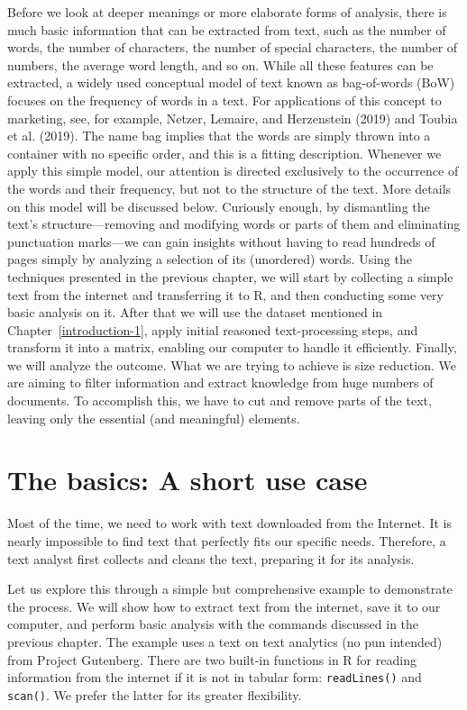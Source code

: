 Before we look at deeper meanings or more elaborate forms of analysis, there
is much basic information that can be extracted from text, such as the
number of words, the number of characters, the number of special
characters, the number of numbers, the average word length, and so on.
While all these features can be extracted, a widely used conceptual
model of text known as bag-of-words (BoW) focuses on the frequency of
words in a text. For applications of this concept to marketing, see,
for example, Netzer, Lemaire, and Herzenstein (2019) and Toubia et al. (2019).
The name bag implies that the words are simply thrown into a container with no
specific order, and this is a fitting description. Whenever we apply
this simple model, our attention is directed exclusively to the
occurrence of the words and their frequency, but not to the structure of
the text. More details on this model will be discussed below. Curiously enough, by dismantling the text's structure---removing
and modifying words or parts of them and eliminating punctuation marks---we can gain insights without having to read hundreds of pages simply by
analyzing a selection of its (unordered) words. Using the techniques
presented in the previous chapter, we will start by collecting a simple
text from the internet and transferring it to R, and then conducting some very
basic analysis on it. After that we will use the dataset mentioned in
Chapter~\ref{introduction-1}, apply initial reasoned text-processing steps, and transform it
into a matrix, enabling our computer to handle it efficiently.
Finally, we will analyze the outcome. What we are trying to achieve
is size reduction. We are aiming to filter
information and extract knowledge from huge numbers of documents. To accomplish this, we have to cut
and remove parts of the text, leaving only the essential (and
meaningful) elements.

\section{The basics: A short use
case}\label{the-basics---a-short-use-case}

Most of the time, we need to work with text downloaded from the
Internet. It is nearly impossible to find text that perfectly fits our
specific needs. Therefore, a text analyst first collects and cleans
the text, preparing it for its analysis.

Let us explore this through a simple but comprehensive example to demonstrate
the process. We will show how to extract text from the internet, save
it to our computer, and perform basic analysis with the commands
discussed in the previous chapter. The example uses a text on text
analytics (no pun intended) from Project Gutenberg. There are two
built-in functions in R for reading information from the internet if it is
not in tabular form: \texttt{readLines()} and \texttt{scan()}. We prefer
the latter for its greater flexibility.

